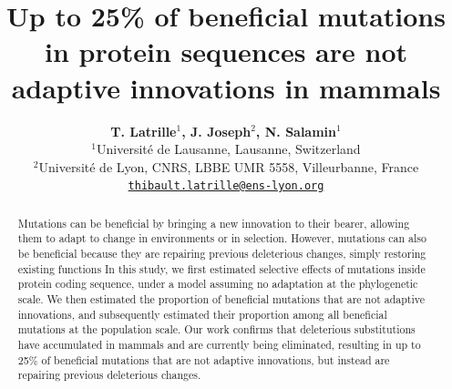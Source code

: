 \documentclass{article}
\title{Up to 25\% of beneficial mutations in protein sequences are not adaptive innovations in mammals}
\author{
    \large
    \textbf{T. {Latrille}$^{1}$, J. {Joseph}$^{2}$, N. {Salamin}$^{1}$}\\
    \normalsize
    $^{1}$Université de Lausanne, Lausanne, Switzerland\\
    $^{2}$Université de Lyon, CNRS, LBBE UMR 5558, Villeurbanne, France \\
    \texttt{\href{mailto:thibault.latrille@ens-lyon.org}{thibault.latrille@ens-lyon.org}} \\
}
\begin{document}
    \maketitle

    \begin{abstract}
        Mutations can be beneficial by bringing a new innovation to their bearer, allowing them to adapt to change in environments or in selection.
        However, mutations can also be beneficial because they are repairing previous deleterious changes, simply restoring existing functions
        In this study, we first estimated selective effects of mutations inside protein coding sequence, under a model assuming no adaptation at the phylogenetic scale.
        We then estimated the proportion of beneficial mutations that are not adaptive innovations, and subsequently estimated their proportion among all beneficial mutations at the population scale.
        Our work confirms that deleterious substitutions have accumulated in mammals and are currently being eliminated, resulting in up to 25\% of beneficial mutations that are not adaptive innovations, but instead are repairing previous deleterious changes.

    \end{abstract}

\end{document}
